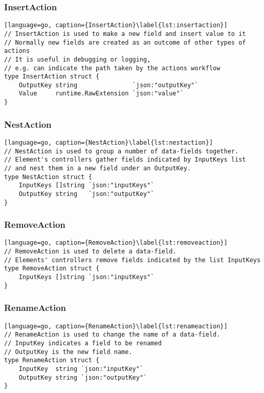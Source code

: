 \subsubsection{InsertAction}
\begin{lstlisting}[language=go, caption={InsertAction}\label{lst:insertaction}]
// InsertAction is used to make a new field and insert value to it
// Normally new fields are created as an outcome of other types of actions
// It is useful in debugging or logging, 
// e.g. can indicate the path taken by the actions workflow
type InsertAction struct {
	OutputKey string               `json:"outputKey"`
	Value     runtime.RawExtension `json:"value"`
}
\end{lstlisting}

\subsubsection{NestAction}
\begin{lstlisting}[language=go, caption={NestAction}\label{lst:nestaction}]
// NestAction is used to group a number of data-fields together.
// Element's controllers gather fields indicated by InputKeys list
// and nest them in a new field under an OutputKey.
type NestAction struct {
	InputKeys []string `json:"inputKeys"`
	OutputKey string   `json:"outputKey"`
}
\end{lstlisting}

\subsubsection{RemoveAction}
\begin{lstlisting}[language=go, caption={RemoveAction}\label{lst:removeaction}]
// RemoveAction is used to delete a data-field.
// Elements' controllers remove fields indicated by the list InputKeys
type RemoveAction struct {
	InputKeys []string `json:"inputKeys"`
}
\end{lstlisting}

\subsubsection{RenameAction}
\begin{lstlisting}[language=go, caption={RenameAction}\label{lst:renameaction}]
// RenameAction is used to change the name of a data-field.
// InputKey indicates a field to be renamed
// OutputKey is the new field name.
type RenameAction struct {
	InputKey  string `json:"inputKey"`
	OutputKey string `json:"outputKey"`
}
\end{lstlisting}

